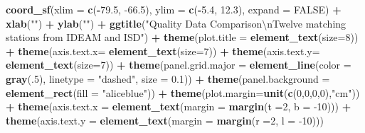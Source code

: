\documentclass[12pt,twoside]{reedthesis}
\newenvironment{Shaded}{\begin{snugshade}}{\end{snugshade}}
\newcommand{\CharTok}[1]{\textcolor[rgb]{0.31,0.60,0.02}{#1}}
\newcommand{\DataTypeTok}[1]{\textcolor[rgb]{0.13,0.29,0.53}{#1}}
\newcommand{\DecValTok}[1]{\textcolor[rgb]{0.00,0.00,0.81}{#1}}
\newcommand{\FloatTok}[1]{\textcolor[rgb]{0.00,0.00,0.81}{#1}}
\newcommand{\KeywordTok}[1]{\textcolor[rgb]{0.13,0.29,0.53}{\textbf{#1}}}
\newcommand{\NormalTok}[1]{#1}
\newcommand{\OperatorTok}[1]{\textcolor[rgb]{0.81,0.36,0.00}{\textbf{#1}}}
\newcommand{\OtherTok}[1]{\textcolor[rgb]{0.56,0.35,0.01}{#1}}
\newcommand{\StringTok}[1]{\textcolor[rgb]{0.31,0.60,0.02}{#1}}
\begin{document}
\begin{Shaded}
\begin{Highlighting}[]
{{{{\StringTok{  }\KeywordTok{coord_sf}\NormalTok{(}\DataTypeTok{xlim =} \KeywordTok{c}\NormalTok{(}\OperatorTok{-}\FloatTok{79.5}\NormalTok{, }\FloatTok{-66.5}\NormalTok{), }\DataTypeTok{ylim =} \KeywordTok{c}\NormalTok{(}\OperatorTok{-}\FloatTok{5.4}\NormalTok{, }\FloatTok{12.3}\NormalTok{), }\DataTypeTok{expand =} \OtherTok{FALSE}\NormalTok{) }\OperatorTok{+}
\StringTok{  }\KeywordTok{xlab}\NormalTok{(}\StringTok{""}\NormalTok{) }\OperatorTok{+}\StringTok{ }
\StringTok{  }\KeywordTok{ylab}\NormalTok{(}\StringTok{""}\NormalTok{) }\OperatorTok{+}\StringTok{ }
\StringTok{  }\KeywordTok{ggtitle}\NormalTok{(}\StringTok{"Quality Data Comparison}\CharTok{\textbackslash{}n}\StringTok{Twelve matching stations from IDEAM and ISD"}\NormalTok{) }\OperatorTok{+}\StringTok{ }
\StringTok{  }\KeywordTok{theme}\NormalTok{(}\DataTypeTok{plot.title =} \KeywordTok{element_text}\NormalTok{(}\DataTypeTok{size=}\DecValTok{8}\NormalTok{)) }\OperatorTok{+}
\StringTok{  }\KeywordTok{theme}\NormalTok{(}\DataTypeTok{axis.text.x=} \KeywordTok{element_text}\NormalTok{(}\DataTypeTok{size=}\DecValTok{7}\NormalTok{)) }\OperatorTok{+}\StringTok{ }
\StringTok{  }\KeywordTok{theme}\NormalTok{(}\DataTypeTok{axis.text.y=} \KeywordTok{element_text}\NormalTok{(}\DataTypeTok{size=}\DecValTok{7}\NormalTok{)) }\OperatorTok{+}
\StringTok{  }\KeywordTok{theme}\NormalTok{(}\DataTypeTok{panel.grid.major =} \KeywordTok{element_line}\NormalTok{(}\DataTypeTok{color =} \KeywordTok{gray}\NormalTok{(.}\DecValTok{5}\NormalTok{), }\DataTypeTok{linetype =} \StringTok{"dashed"}\NormalTok{, }\DataTypeTok{size =} \FloatTok{0.1}\NormalTok{)) }\OperatorTok{+}
\StringTok{  }\KeywordTok{theme}\NormalTok{(}\DataTypeTok{panel.background =} \KeywordTok{element_rect}\NormalTok{(}\DataTypeTok{fill =} \StringTok{"aliceblue"}\NormalTok{)) }\OperatorTok{+}
\StringTok{  }\KeywordTok{theme}\NormalTok{(}\DataTypeTok{plot.margin=}\KeywordTok{unit}\NormalTok{(}\KeywordTok{c}\NormalTok{(}\DecValTok{0}\NormalTok{,}\DecValTok{0}\NormalTok{,}\DecValTok{0}\NormalTok{,}\DecValTok{0}\NormalTok{),}\StringTok{"cm"}\NormalTok{)) }\OperatorTok{+}
\StringTok{  }\KeywordTok{theme}\NormalTok{(}\DataTypeTok{axis.text.x =} \KeywordTok{element_text}\NormalTok{(}\DataTypeTok{margin =}  \KeywordTok{margin}\NormalTok{(}\DataTypeTok{t =}\DecValTok{2}\NormalTok{, }\DataTypeTok{b =} \DecValTok{-10}\NormalTok{))) }\OperatorTok{+}\StringTok{ }
\StringTok{  }\KeywordTok{theme}\NormalTok{(}\DataTypeTok{axis.text.y =} \KeywordTok{element_text}\NormalTok{(}\DataTypeTok{margin =}  \KeywordTok{margin}\NormalTok{(}\DataTypeTok{r =}\DecValTok{2}\NormalTok{, }\DataTypeTok{l =} \DecValTok{-10}\NormalTok{)))}
  
}}}}
\end{Highlighting}
\end{Shaded}
\end{document}
